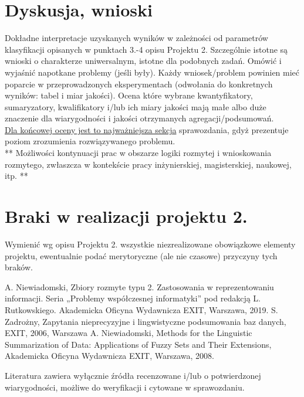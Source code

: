 \documentclass{classrep}
\begin{document}
\section{Dyskusja, wnioski}
Dokładne interpretacje uzyskanych wyników w zależności od parametrów klasyfikacji
opisanych w punktach 3.-4 opisu Projektu 2. 
Szczególnie istotne są wnioski o charakterze uniwersalnym, istotne dla podobnych zadań. 
Omówić i wyjaśnić napotkane problemy (jeśli były). Każdy wniosek/problem powinien mieć poparcie
w przeprowadzonych eksperymentach (odwołania do konkretnych wyników: tabel i miar
jakości). Ocena które wybrane kwantyfikatory, sumaryzatory, kwalifikatory i/lub ich
miary jakości mają małe albo duże znaczenie dla wiarygodności i jakości otrzymanych
agregacji/podsumowań.  \\
\underline{Dla końcowej oceny jest to najważniejsza sekcja} sprawozdania, gdyż prezentuje poziom
zrozumienia rozwiązywanego problemu.\\

** Możliwości kontynuacji prac w obszarze logiki rozmytej i wnioskowania rozmytego, zwłaszcza w kontekście pracy inżynierskiej,
magisterskiej, naukowej, itp. **\\



\section{Braki w realizacji projektu 2.}
Wymienić wg opisu Projektu 2. wszystkie niezrealizowane obowiązkowe elementy projektu, ewentualnie
podać merytoryczne (ale nie czasowe) przyczyny tych braków. 


\begin{thebibliography}{99}
  A. Niewiadomski, Zbiory rozmyte typu 2. Zastosowania w reprezentowaniu informacji.  Seria „Problemy współczesnej informatyki” pod redakcją L. Rutkowskiego. Akademicka Oficyna Wydawnicza EXIT, Warszawa, 2019.
 S. Zadrożny, Zapytania nieprecyzyjne i lingwistyczne podsumowania baz danych, EXIT, 2006, Warszawa
 A. Niewiadomski, Methods for the Linguistic Summarization of Data: Applications of Fuzzy Sets and Their Extensions, Akademicka Oficyna Wydawnicza EXIT, Warszawa, 2008.
\end{thebibliography}

Literatura zawiera wyłącznie źródła recenzowane i/lub o potwierdzonej wiarygodności,
możliwe do weryfikacji i cytowane w sprawozdaniu. 
\end{document}
